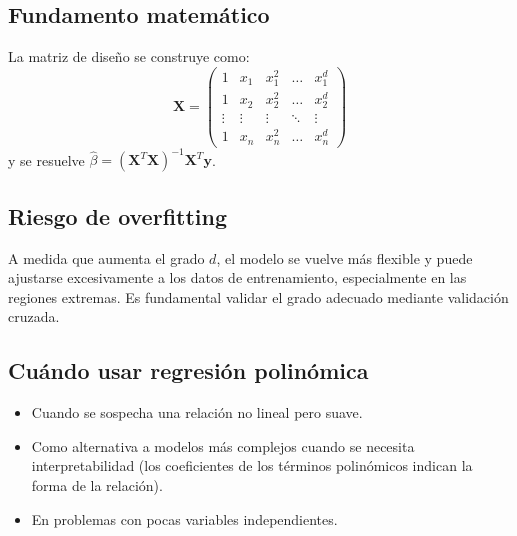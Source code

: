 \documentclass[12pt,a4paper,openany,oneside]{book}
\begin{document}
\subsection{Fundamento matemático}
La matriz de diseño se construye como:
\[
\mathbf{X} = \begin{pmatrix}
1 & x_1 & x_1^2 & \dots & x_1^d \\
1 & x_2 & x_2^2 & \dots & x_2^d \\
\vdots & \vdots & \vdots & \ddots & \vdots \\
1 & x_n & x_n^2 & \dots & x_n^d
\end{pmatrix}
\]
y se resuelve \(\hat{\beta} = (\mathbf{X}^T \mathbf{X})^{-1} \mathbf{X}^T \mathbf{y}\).

\subsection{Riesgo de overfitting}
A medida que aumenta el grado \(d\), el modelo se vuelve más flexible y puede ajustarse excesivamente a los datos de entrenamiento, especialmente en las regiones extremas. Es fundamental validar el grado adecuado mediante validación cruzada.

\begin{center}
\caption{Regresión polinómica: grado 2 (azul) generaliza bien; grado 5 (rojo) sobreajusta.}
\end{center}

\subsection{Cuándo usar regresión polinómica}
\begin{itemize}
    \item Cuando se sospecha una relación no lineal pero suave.
    \item Como alternativa a modelos más complejos cuando se necesita interpretabilidad (los coeficientes de los términos polinómicos indican la forma de la relación).
    \item En problemas con pocas variables independientes.
\end{itemize}
\end{document}
